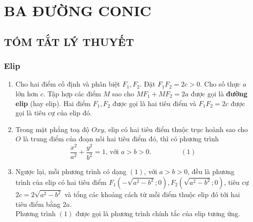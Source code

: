 \newpage\setcounter{dang}{0}
\section{BA ĐƯỜNG CONIC}
\subsection{TÓM TẮT LÝ THUYẾT}
\subsubsection{Elip}
\begin{enumerate}[-]
	\item Cho hai điểm cố định và phân biệt $F_{1}, F_{2}$. Đặt $F_{1} F_{2}=2 c>0$. Cho số thực $ a $ lớn hơn $c$. Tập hợp các điểm $M$ sao cho $M F_{1}+M F_{2}=2 a$ được gọi là \textbf{đường elip} (hay elip). Hai điểm $F_{1}, F_{2}$ được gọi là hai tiêu điểm và $F_{1} F_{2}=2 c$ được gọi là tiêu cự của elip đó.
	\begin{center}
	\end{center}
	\item Trong mặt phẳng toạ độ $O x y$, elip có hai tiêu điểm thuộc trục hoành sao cho $O$ là trung điểm của đoạn nối hai tiêu điểm đó, thì có phương trình
	$$
	\dfrac{x^{2}}{a^{2}}+\dfrac{y^{2}}{b^{2}}=1 \text {, với } a>b>0 \text {. } \quad \quad \quad \quad (1)
	$$
	\item Ngược lại, mỗi phương trình có dạng $ (1) $, với $a>b>0$, đều là phương trình của elip có hai tiêu điểm $F_{1}\left(-\sqrt{a^{2}-b^{2}} ; 0\right), F_{2}\left(\sqrt{a^{2}-b^{2}} ; 0\right)$, tiêu cự $2 c=2 \sqrt{a^{2}-b^{2}}$ và tổng các khoảng cách từ mỗi điểm thuộc elip đó tới hai tiêu điểm bằng $2 a$.\\
	Phương trình $ (1) $ được gọi là phương trình chính tắc của elip tương ứng.
\end{enumerate}

